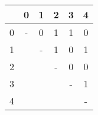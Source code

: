 \begin{tabular}{r|ccccc}
	&	0	&	1	&	2	&	3	&	4	\\
\hline
0	&	-	&	0	&	1	&	1	&	0	\\
1	&		&	-	&	1	&	0	&	1	\\
2	&		&		&	-	&	0	&	0	\\
3	&		&		&		&	-	&	1	\\
4	&		&		&		&		&	-	\\
\end{tabular}
